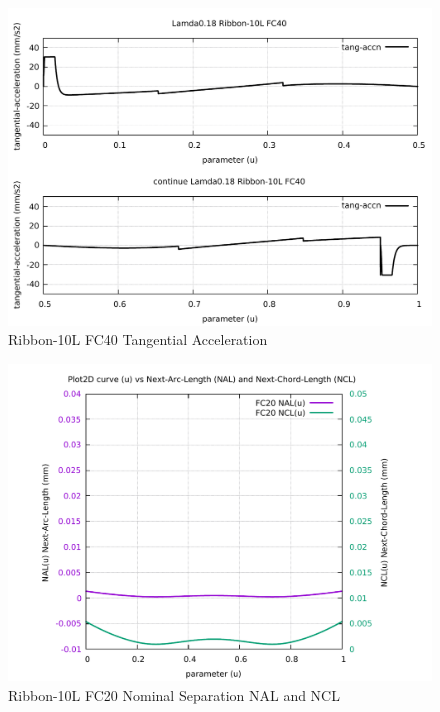 \begin{figure}
	\caption     {Ribbon-10L FC40 Tangential Acceleration}
	\label{24-img-Ribbon-10L-FC40-Tangential-Acceleration.pdf}
\includegraphics[width=1.00\textwidth]{Chap4/appendix/app-Ribbon-10L/plots/24-img-Ribbon-10L-FC40-Tangential-Acceleration.pdf}
\end{figure}

\clearpage
\pagebreak

\begin{figure}
	\caption     {Ribbon-10L FC20 Nominal Separation NAL and NCL}
	\label{25-img-Ribbon-10L-FC20-Nominal-Separation-NAL-and-NCL.pdf}
\includegraphics[width=1.00\textwidth]{Chap4/appendix/app-Ribbon-10L/plots/25-img-Ribbon-10L-FC20-Nominal-Separation-NAL-and-NCL.pdf}
\end{figure}


